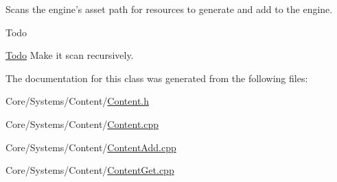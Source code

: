 Scans the engine's asset path for resources to generate and add to the engine. 

\begin{DoxyRefDesc}{Todo}
\item[\hyperlink{todo__todo000017}{Todo}]Make it scan recursively. \end{DoxyRefDesc}


The documentation for this class was generated from the following files\-:\begin{DoxyCompactItemize}
\item 
Core/\-Systems/\-Content/\hyperlink{Content_8h}{Content.\-h}\item 
Core/\-Systems/\-Content/\hyperlink{Content_8cpp}{Content.\-cpp}\item 
Core/\-Systems/\-Content/\hyperlink{ContentAdd_8cpp}{Content\-Add.\-cpp}\item 
Core/\-Systems/\-Content/\hyperlink{ContentGet_8cpp}{Content\-Get.\-cpp}\end{DoxyCompactItemize}
